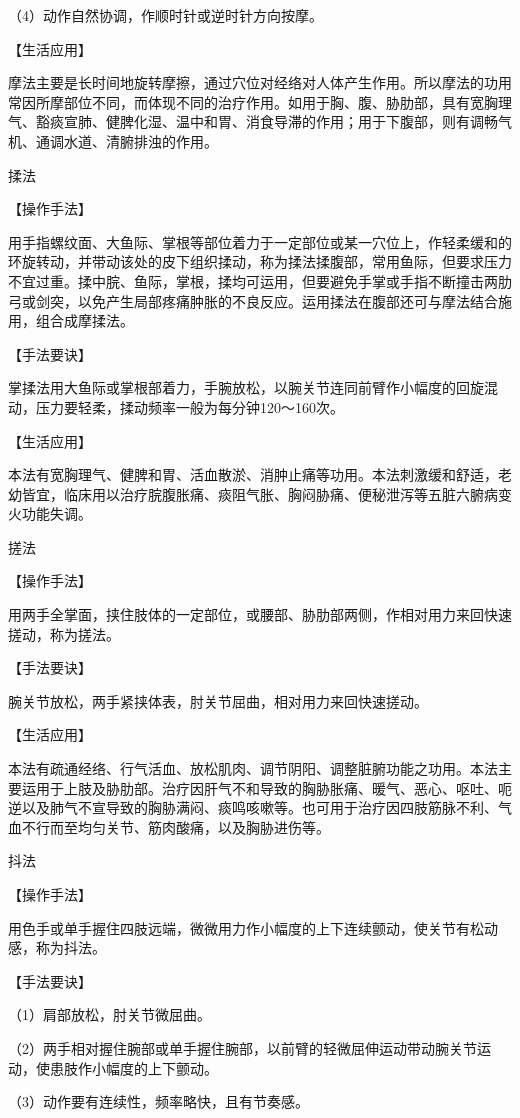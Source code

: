 \documentclass[12pt,UTF8]{ctexbook}
\begin{document}
（4）动作自然协调，作顺时针或逆时针方向按摩。

【生活应用】

摩法主要是长时间地旋转摩擦，通过穴位对经络对人体产生作用。所以摩法的功用常因所摩部位不同，而体现不同的治疗作用。如用于胸、腹、胁肋部，具有宽胸理气、豁痰宣肺、健脾化湿、温中和胃、消食导滞的作用；用于下腹部，则有调畅气机、通调水道、清腑排浊的作用。

揉法

【操作手法】

用手指螺纹面、大鱼际、掌根等部位着力于一定部位或某一穴位上，作轻柔缓和的环旋转动，并带动该处的皮下组织揉动，称为揉法揉腹部，常用鱼际，但要求压力不宜过重。揉中脘、鱼际，掌根，揉均可运用，但要避免手掌或手指不断撞击两肋弓或剑突，以免产生局部疼痛肿胀的不良反应。运用揉法在腹部还可与摩法结合施用，组合成摩揉法。

【手法要诀】

掌揉法用大鱼际或掌根部着力，手腕放松，以腕关节连同前臂作小幅度的回旋混动，压力要轻柔，揉动频率一般为每分钟120～160次。

【生活应用】

本法有宽胸理气、健脾和胃、活血散淤、消肿止痛等功用。本法刺激缓和舒适，老幼皆宜，临床用以治疗脘腹胀痛、痰阻气胀、胸闷胁痛、便秘泄泻等五脏六腑病变火功能失调。

搓法

【操作手法】

用两手全掌面，挟住肢体的一定部位，或腰部、胁肋部两侧，作相对用力来回快速搓动，称为搓法。

【手法要诀】

腕关节放松，两手紧挟体表，肘关节屈曲，相对用力来回快速搓动。

【生活应用】

本法有疏通经络、行气活血、放松肌肉、调节阴阳、调整脏腑功能之功用。本法主要运用于上肢及胁肋部。治疗因肝气不和导致的胸胁胀痛、暖气、恶心、呕吐、呃逆以及肺气不宣导致的胸胁满闷、痰鸣咳嗽等。也可用于治疗因四肢筋脉不利、气血不行而至均匀关节、筋肉酸痛，以及胸胁进伤等。

抖法

【操作手法】

用色手或单手握住四肢远端，微微用力作小幅度的上下连续颤动，使关节有松动感，称为抖法。

【手法要诀】

（1）肩部放松，肘关节微屈曲。

（2）两手相对握住腕部或单手握住腕部，以前臂的轻微屈伸运动带动腕关节运动，使患肢作小幅度的上下颤动。

（3）动作要有连续性，频率略快，且有节奏感。
\end{document}
